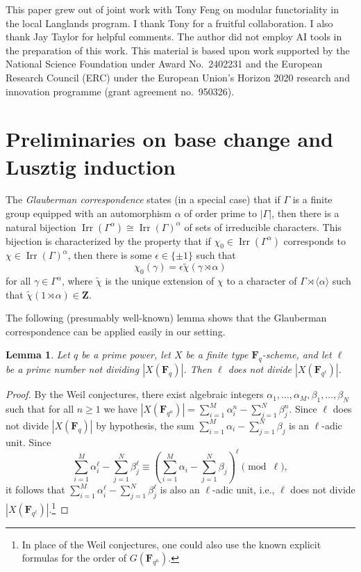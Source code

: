 \documentclass[11pt,reqno]{amsart}
\newtheorem{lemma}[theorem]{Lemma}
\theoremstyle{definition}
\newcommand{\bZ}{{\mathbf Z}}
\newcommand{\F}{{\mathbf F}}
\DeclareMathOperator{\Irr}{Irr}
\begin{document}
This paper grew out of joint work with Tony Feng on modular functoriality in the local Langlands program. I thank Tony for a fruitful collaboration. I also thank Jay Taylor for helpful comments. The author did not employ AI tools in the preparation of this work.
This material is based upon work supported by the National Science Foundation under Award No.\ 2402231 and the European Research Council (ERC) under the European Union’s Horizon 2020 research and innovation programme (grant agreement no.\ 950326).









\section{Preliminaries on base change and Lusztig induction}

The \emph{Glauberman correspondence} \cite[Theorem 3]{Gla68} states (in a special case) that if $\Gamma$ is a finite group equipped with an automorphism $\alpha$ of order prime to $|\Gamma|$, then there is a natural bijection $\Irr(\Gamma^\alpha) \cong \Irr(\Gamma)^\alpha$ of sets of irreducible characters. This bijection is characterized by the property that if $\chi_0 \in \Irr(\Gamma^\alpha)$ corresponds to $\chi \in \Irr(\Gamma)^\alpha$, then there is some $\epsilon \in \{\pm 1\}$ such that
\[
\chi_0(\gamma) = \epsilon\widetilde\chi(\gamma \rtimes \alpha)
\]
for all $\gamma \in \Gamma^\alpha$, where $\widetilde\chi$ is the unique extension of $\chi$ to a character of $\Gamma \rtimes \langle\alpha\rangle$ such that $\widetilde\chi(1 \rtimes \alpha) \in \bZ$.

The following (presumably well-known) lemma shows that the Glauberman correspondence can be applied easily in our setting.

\begin{lemma}\label{lemma:size-of-finite-group-of-lie-type}
    Let $q$ be a prime power, let $X$ be a finite type $\F_q$-scheme, and let $\ell$ be a prime number not dividing $|X(\F_q)|$. Then $\ell$ does not divide $|X(\F_{q^\ell})|$.
\end{lemma}

\begin{proof}
    By the Weil conjectures, there exist algebraic integers $\alpha_1, \dots, \alpha_M, \beta_1, \dots, \beta_N$ such that for all $n \geq 1$ we have $|X(\F_{q^n})| = \sum_{i=1}^M \alpha_i^n - \sum_{j=1}^N \beta_j^n$. Since $\ell$ does not divide $|X(\F_q)|$ by hypothesis, the sum $\sum_{i=1}^M \alpha_i - \sum_{j=1}^N \beta_j$ is an $\ell$-adic unit. Since 
    \[
    \sum_{i=1}^M \alpha_i^\ell - \sum_{j=1}^N \beta_j^\ell \equiv \left( \sum_{i=1}^M \alpha_i - \sum_{j=1}^N \beta_j\right)^\ell \pmod{\ell},
    \]
    it follows that $\sum_{i=1}^M \alpha_i^\ell - \sum_{j=1}^N \beta_j^\ell$ is also an $\ell$-adic unit, i.e., $\ell$ does not divide $|X(\F_{q^\ell})|$.\footnote{In place of the Weil conjectures, one could also use the known explicit formulas for the order of $G(\F_{q^n})$.}
\end{proof}
\end{document}
